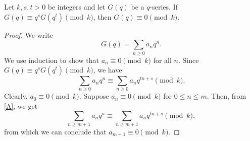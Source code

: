\documentclass[10pt,a4paper]{amsart}
\begin{document}
\begin{lemma}\label{Gq=qGq}
   Let $k,s,t>0$ be integers and let $G(q)$ be a $q$-series. If $G(q)\equiv q^sG(q^t)\pmod{k}$, then $G(q)\equiv 0\pmod{k}$.
\end{lemma}

\begin{proof}
    We write
    \begin{equation*}
        G(q)=\sum_{n\geq0}a_nq^n.
    \end{equation*}
We use induction to show that $a_n\equiv0\pmod{k}$ for all $n$. Since $G(q)\equiv q^sG(q^t)\pmod{k}$, we have
\begin{equation}\label{A}
\sum_{n\geq0}a_nq^n\equiv\sum_{n\geq0}a_nq^{tn+s}\pmod{k}.
    \end{equation}
Clearly, $a_0\equiv0\pmod{k}$. Suppose $a_n\equiv0\pmod k$ for $0\leq n\leq m$. Then, from \eqref{A}, we get
\begin{equation*}
\sum_{n\geq m+1}a_nq^n\equiv\sum_{n\geq m+1}a_nq^{tn+s}\pmod{k},
    \end{equation*}
from which we can conclude that $a_{m+1}\equiv0\pmod{k}$.
\end{proof}
\end{document}

